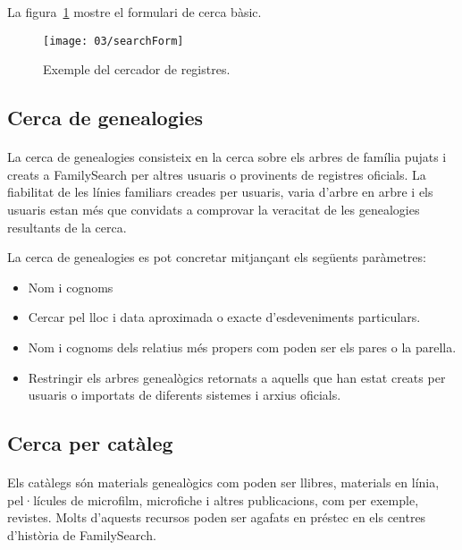         La figura~\ref{fig:fsSearcher} mostre el formulari de cerca bàsic.

        \begin{figure}[h]
            \texttt{[image: 03/searchForm]}
            \centering
            \caption{Exemple del cercador de registres.\label{fig:fsSearcher}}
        \end{figure}


    \subsection{Cerca de genealogies}

        \paragraph{}
        La cerca de genealogies consisteix en la cerca sobre els arbres de família pujats i creats a FamilySearch per altres usuaris o provinents de registres oficials. La fiabilitat de les línies familiars creades per usuaris, varia d’arbre en arbre i els usuaris estan més que convidats a comprovar la veracitat de les genealogies resultants de la cerca.

        La cerca de genealogies es pot concretar mitjançant els següents paràmetres:

        \begin{itemize}
            \item Nom i cognoms
            \item Cercar pel lloc i data aproximada o exacte d’esdeveniments particulars.
            \item Nom i cognoms dels relatius més propers com poden ser els pares o la parella.
            \item Restringir els arbres genealògics retornats a aquells que han estat creats per usuaris o importats de diferents sistemes i arxius oficials.
        \end{itemize}


    \subsection{Cerca per catàleg}

        \paragraph{}
        Els catàlegs són materials genealògics com poden ser llibres, materials en línia, pel·lícules de microfilm, microfiche i altres publicacions, com per exemple, revistes. Molts d’aquests recursos poden ser agafats en préstec en els centres d’història de FamilySearch.


